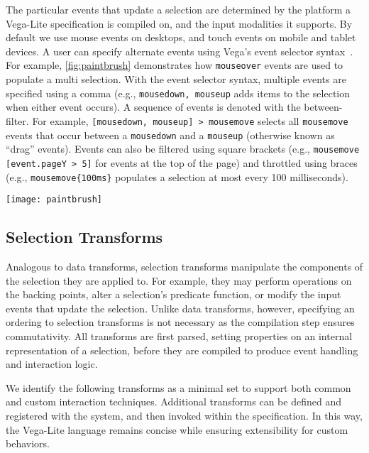The particular events that update a selection are determined by the platform a
Vega-Lite specification is compiled on, and the input modalities it supports. By
default we use mouse events on desktops, and touch events on mobile and tablet
devices. A user can specify alternate events using Vega's event selector
syntax~\cite{reactive-vega-model}. For example, \cref{fig:paintbrush}
demonstrates how \texttt{mouseover} events are used to populate a multi
selection. With the event selector syntax, multiple events are specified using a
comma (e.g., \texttt{mousedown, mouseup} adds items to the selection when either
event occurs). A sequence of events is denoted with the between-filter. For
example, \texttt{[mousedown, mouseup] > mousemove} selects all
\texttt{mousemove} events that occur between a \texttt{mousedown} and a
\texttt{mouseup} (otherwise known as ``drag'' events). Events can also be
filtered using square brackets (e.g., \texttt{mousemove [event.pageY > 5]} for
events at the top of the page) and throttled using braces (e.g.,
\texttt{mousemove\{100ms\}} populates a selection at most every 100
milliseconds).

\begin{figure*}[h!]
  \centering
  \texttt{[image: paintbrush]}
  \caption{Specifying a custom event trigger for a \emph{multi} selection: the
  first point is selected on \texttt{mouseover} and subsequent points when the
  shift key is pressed.}
  \label{fig:paintbrush}
\end{figure*}

\subsection{Selection Transforms}

Analogous to data transforms, selection transforms manipulate the components of
the selection they are applied to. For example, they may perform operations on
the backing points, alter a selection's predicate function, or modify the input
events that update the selection. Unlike data transforms, however, specifying an
ordering to selection transforms is not necessary as the compilation step
ensures commutativity. All transforms are first parsed, setting properties on an
internal representation of a selection, before they are compiled to produce
event handling and interaction logic.

We identify the following transforms as a minimal set to support both common and
custom interaction techniques. Additional transforms can be defined and
registered with the system, and then invoked within the specification. In this
way, the Vega-Lite language remains concise while ensuring extensibility for
custom behaviors.

